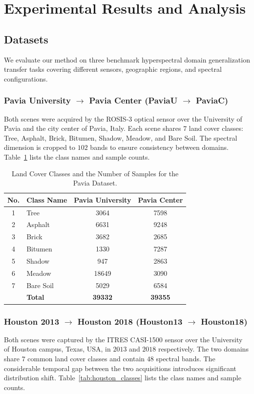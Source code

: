 \section{Experimental Results and Analysis}
\label{sec:experiments}

\subsection{Datasets}
We evaluate our method on three benchmark hyperspectral domain generalization transfer tasks covering different sensors, geographic regions, and spectral configurations.

\subsubsection{Pavia University $\to$ Pavia Center (PaviaU $\to$ PaviaC)}
Both scenes were acquired by the ROSIS-3 optical sensor over the University of Pavia and the city center of Pavia, Italy. Each scene shares $7$ land cover classes: Tree, Asphalt, Brick, Bitumen, Shadow, Meadow, and Bare Soil. The spectral dimension is cropped to $102$ bands to ensure consistency between domains. Table~\ref{tab:pavia_classes} lists the class names and sample counts.

\begin{table}[h]
\centering
\caption{Land Cover Classes and the Number of Samples for the Pavia Dataset.}
\label{tab:pavia_classes}
\begin{tabular}{clcc}
\toprule
\textbf{No.} & \textbf{Class Name} & \textbf{Pavia University} & \textbf{Pavia Center} \\
\midrule
1 & Tree         & 3064  & 7598  \\
2 & Asphalt      & 6631  & 9248  \\
3 & Brick        & 3682  & 2685  \\
4 & Bitumen      & 1330  & 7287  \\
5 & Shadow       & 947   & 2863  \\
6 & Meadow       & 18649 & 3090  \\
7 & Bare Soil    & 5029  & 6584  \\
\midrule
  & \textbf{Total} & \textbf{39332} & \textbf{39355} \\
\bottomrule
\end{tabular}
\end{table}



\subsubsection{Houston 2013 $\to$ Houston 2018 (Houston13 $\to$ Houston18)}
Both scenes were captured by the ITRES CASI-1500 sensor over the University of Houston campus, Texas, USA, in $2013$ and $2018$ respectively. The two domains share $7$ common land cover classes and contain $48$ spectral bands. The considerable temporal gap between the two acquisitions introduces significant distribution shift. Table~\ref{tab:houston_classes} lists the class names and sample counts.

